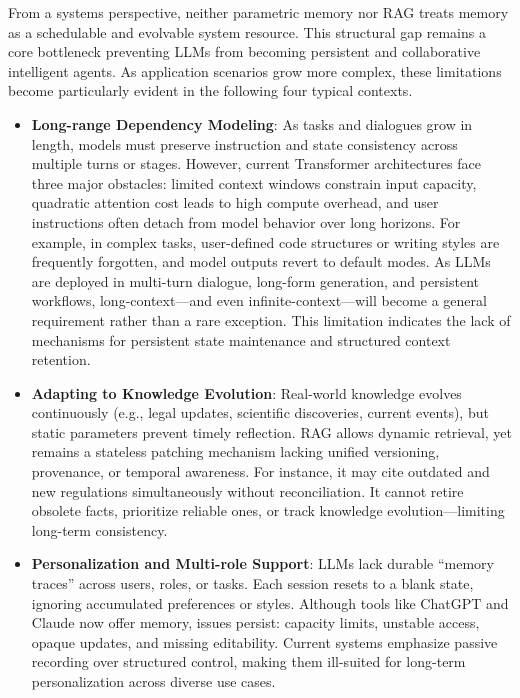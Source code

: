 \documentclass[]{memtensor}
\begin{document}
From a systems perspective, neither parametric memory nor RAG treats memory as a schedulable and evolvable system resource.
This structural gap remains a core bottleneck preventing LLMs from becoming persistent and collaborative intelligent agents.
As application scenarios grow more complex, these limitations become particularly evident in the following four typical contexts.

\begin{itemize}
    \item \textbf{Long-range Dependency Modeling}: As tasks and dialogues grow in length, models must preserve instruction and state consistency across multiple turns or stages.
    However, current Transformer architectures face three major obstacles: limited context windows constrain input capacity, quadratic attention cost leads to high compute overhead, and user instructions often detach from model behavior over long horizons.
    For example, in complex tasks, user-defined code structures or writing styles are frequently forgotten, and model outputs revert to default modes.
    As LLMs are deployed in multi-turn dialogue, long-form generation, and persistent workflows, long-context—and even infinite-context—will become a general requirement rather than a rare exception.
    This limitation indicates the lack of mechanisms for persistent state maintenance and structured context retention.

    \item \textbf{Adapting to Knowledge Evolution}: Real-world knowledge evolves continuously (e.g., legal updates, scientific discoveries, current events), but static parameters prevent timely reflection. RAG allows dynamic retrieval, yet remains a stateless patching mechanism lacking unified versioning, provenance, or temporal awareness. For instance, it may cite outdated and new regulations simultaneously without reconciliation. It cannot retire obsolete facts, prioritize reliable ones, or track knowledge evolution—limiting long-term consistency.

    \item \textbf{Personalization and Multi-role Support}: LLMs lack durable “memory traces” across users, roles, or tasks. Each session resets to a blank state, ignoring accumulated preferences or styles. Although tools like ChatGPT and Claude now offer memory, issues persist: capacity limits, unstable access, opaque updates, and missing editability. Current systems emphasize passive recording over structured control, making them ill-suited for long-term personalization across diverse use cases.


\end{itemize}
\end{document}
